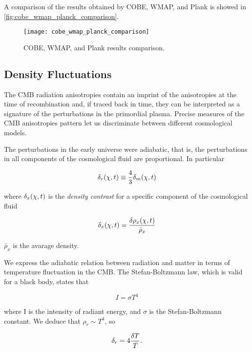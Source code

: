 A comparison of the results obtained by COBE, WMAP, and Plank is showed in
\autoref{fig:cobe_wmap_planck_comparison}.

\begin{figure}
        \centering
        \texttt{[image: cobe\_wmap\_planck\_comparison]}
        \caption{COBE, WMAP, and Plank results comparison.}
        \label{fig:cobe_wmap_planck_comparison}
\end{figure}

\subsection{Density Fluctuations}

The CMB radiation anisotropies contain an imprint of the anisotropies at
the time of recombination and, if traced back in time, they can be
interpreted as a signature of the perturbations in the primordial plasma.
Precise measures of the CMB anisotropies pattern let us discriminate
between different cosmological models.

The perturbations in the early universe were adiabatic, that is, the
perturbations in all components of the cosmological fluid are proportional.
In particular

\begin{equation}
        \delta_r\qty(\vb{\chi},t) \equiv \frac{4}{3} \delta_m\qty(\vb{\chi},t) 
\end{equation}

where $\delta_x\qty(\vb{\chi},t)$ is the \emph{density contrast} for a
specific component of the cosmological fluid

\begin{equation}
        \delta_x\qty(\vb{\chi},t) = \frac{\var{\rho_x\qty(\vb{\chi},t)}}{\bar \rho_x}
\end{equation}

$\bar \rho_x$ is the avarage density.

We express the adiabatic relation between radiation and matter in terms of
temperature fluctuation in the CMB. The Stefan-Boltzmann law, which is
valid for a black body, states that

\begin{equation}
        I = \sigma T^4 
\end{equation}

where I is the intensity of radiant energy, and $\sigma$ is the
Stefan-Boltzmann constant. We deduce that $\rho_r \sim T^4$, so

\begin{equation}
        \delta_r = 4 \frac{\var{T}}{\bar T}. 
\end{equation}

